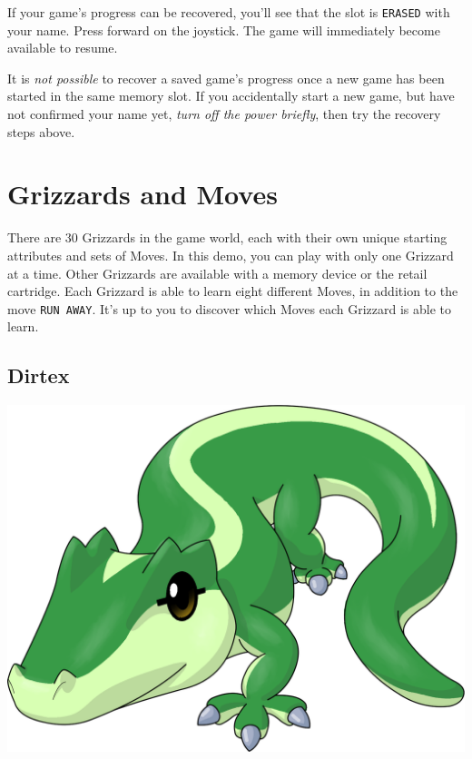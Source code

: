 \documentclass[10pt,twocolumn,openany,article]{memoir}
\begin{document}
If your  game's progress can be  recovered, you'll see that  the slot is
\texttt{ERASED} with your name. Press  forward on the joystick. The game
will immediately become available to resume.

It is \emph{not possible} to recover  a saved game's progress once a new
game has been started in the same memory slot. If you accidentally start
a new  game, but have  not confirmed your  name yet, \emph{turn  off the
  power briefly}, then try the recovery steps above.

\fi

\fi %

\chapter{Grizzards and Moves}\label{ch:Grizzards}

There are  30 Grizzards in  the game world,  each with their  own unique
starting attributes and  sets of Moves. \ifdefined\NOSAVE  In this demo,
you  can play  with only  one Grizzard  at a  time. Other  Grizzards are
available  with  a memory  device  or  the  retail cartridge.  \fi  Each
Grizzard is able to learn eight different Moves, in addition to the move
\texttt{RUN AWAY}. It's up to you  to discover which Moves each Grizzard
is able to learn.



\ifdefined\DEMO\else

\pagebreak

\section{Dirtex}

\begin{center}
  \vspace{14pt}
  \includegraphics[width=\columnwidth]{../Manual/Dirtex.png}
  \vspace{14pt}
\end{center}
\end{document}
